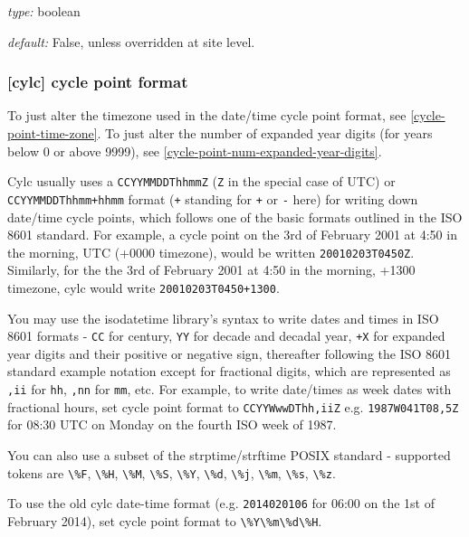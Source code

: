 \begin{myitemize}
    \item {\em type:} boolean
    \item {\em default:} False, unless overridden at site level.
\end{myitemize}

\subsubsection[cycle point format]{ [cylc] \textrightarrow cycle point format}
\label{cycle-point-format}

To just alter the timezone used in the date/time cycle point format, see
\ref{cycle-point-time-zone}. To just alter the number of expanded year digits
(for years below 0 or above 9999), see
\ref{cycle-point-num-expanded-year-digits}.

Cylc usually uses a \lstinline=CCYYMMDDThhmmZ= (\lstinline=Z= in the special
case of UTC) or \lstinline=CCYYMMDDThhmm+hhmm= format (\lstinline=+= standing
for \lstinline=+= or \lstinline=-= here) for writing down date/time cycle
points, which follows one of the basic formats outlined in the ISO 8601
standard. For example, a cycle point on the 3rd of February 2001 at 4:50 in
the morning, UTC (+0000 timezone), would be written
\lstinline=20010203T0450Z=. Similarly, for the the 3rd of February 2001 at
4:50 in the morning, +1300 timezone, cylc would write
\lstinline=20010203T0450+1300=.

You may use the isodatetime library's syntax to write dates and times in ISO
8601 formats - \lstinline=CC= for century, \lstinline=YY= for decade and
decadal year, \lstinline=+X= for expanded year digits and their positive or
negative sign, thereafter following the ISO 8601 standard example notation
except for fractional digits, which are represented as \lstinline=,ii= for
\lstinline=hh=, \lstinline=,nn= for \lstinline=mm=, etc. For example, to write
date/times as week dates with fractional hours, set cycle point format to
\lstinline=CCYYWwwDThh,iiZ= e.g. \lstinline=1987W041T08,5Z= for 08:30 UTC on
Monday on the fourth ISO week of 1987.

You can also use a subset of the strptime/strftime POSIX standard - supported
tokens are \lstinline=\%F=, \lstinline=\%H=, \lstinline=\%M=, \lstinline=\%S=,
\lstinline=\%Y=, \lstinline=\%d=, \lstinline=\%j=, \lstinline=\%m=,
\lstinline=\%s=, \lstinline=\%z=.

To use the old cylc date-time format (e.g. \lstinline=2014020106= for 06:00
on the 1st of February 2014), set cycle point format to
\lstinline=\%Y\%m\%d\%H=.

